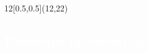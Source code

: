 \begin{frame}
\cleardoublepage
\pagecolor{black}

\begin{textblock}{12}[0.5,0.5](12,22)
    \textcolor{white}{
    \part{Problems of Shooting}\label{shooting}
	}
\end{textblock}
\end{frame}



















